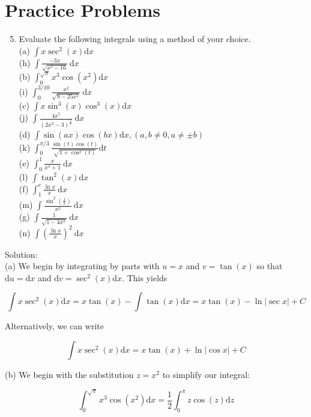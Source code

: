 \documentclass[10pt]{article}
\begin{document}
\section*{Practice Problems}
\begin{enumerate}
  \setcounter{enumi}{4}
  \item Evaluate the following integrals using a method of your choice.\\
(a) $\int x \sec ^{2}(x) \mathrm{d} x$\\
(h) $\int \frac{-3 x}{\sqrt{x^{2}-16}} \mathrm{~d} x$\\
(b) $\int_{0}^{\sqrt{\pi}} x^{3} \cos \left(x^{2}\right) \mathrm{d} x$\\
(i) $\int_{0}^{3 / 10} \frac{x^{2}}{\sqrt{9-25 x^{2}}} \mathrm{~d} x$\\
(c) $\int x \sin ^{3}(x) \cos ^{3}(x) \mathrm{d} x$\\
(j) $\int \frac{4 x^{5}}{\left(2 x^{2}-3\right)^{\frac{3}{2}}} \mathrm{~d} x$\\
(d) $\int \sin (a x) \cos (b x) \mathrm{d} x,(a, b \neq 0, a \neq \pm b)$\\
(k) $\int_{0}^{\pi / 3} \frac{\sin (t) \cos (t)}{\sqrt{1+\cos ^{2}(t)}} \mathrm{d} t$\\
(e) $\int_{0}^{1} \frac{x}{x^{4}+1} \mathrm{~d} x$\\
(l) $\int \tan ^{2}(x) \mathrm{d} x$\\
(f) $\int_{1}^{e} \frac{\ln x}{x} \mathrm{~d} x$\\
(m) $\int \frac{\sin ^{2}\left(\frac{1}{x}\right)}{x^{2}} \mathrm{~d} x$\\
(g) $\int \frac{1}{\sqrt{1-4 x^{2}}} \mathrm{~d} x$\\
(n) $\int\left(\frac{\ln x}{x}\right)^{2} \mathrm{~d} x$
\end{enumerate}

Solution:\\
(a) We begin by integrating by parts with $u=x$ and $v=\tan (x)$ so that $\mathrm{d} u=\mathrm{d} x$ and $\mathrm{d} v=\sec ^{2}(x) \mathrm{d} x$. This yields

$$
\int x \sec ^{2}(x) \mathrm{d} x=x \tan (x)-\int \tan (x) \mathrm{d} x=x \tan (x)-\ln |\sec x|+C
$$

Alternatively, we can write

$$
\int x \sec ^{2}(x) \mathrm{d} x=x \tan (x)+\ln |\cos x|+C
$$

(b) We begin with the substitution $z=x^{2}$ to simplify our integral:

$$
\int_{0}^{\sqrt{\pi}} x^{3} \cos \left(x^{2}\right) \mathrm{d} x=\frac{1}{2} \int_{0}^{\pi} z \cos (z) \mathrm{d} z
$$
\end{document}
